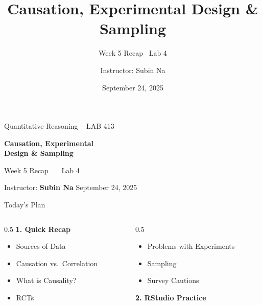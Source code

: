 \documentclass[aspectratio=169,11pt]{beamer}
\title{\bfseries Causation, Experimental Design \& Sampling}
\subtitle{Week 5 Recap \textbullet\ Lab 4}
\author{Instructor: Subin Na}
\institute{Quantitative Reasoning -- LAB 413}
\date{September 24, 2025}
\begin{document}
{
\begin{frame}
  \vfill
  {\color{qrgray}\small Quantitative Reasoning -- LAB 413}\\[0.6em]
  {\color{qrnavy}\huge\bfseries Causation, Experimental\\[0.15em]Design \& Sampling\par}
  \vspace{0.4em}
  {\color{qrblue}\large Week 5 Recap \ \textbullet\ \ Lab 4}\par
  \vspace{1.6em}
  {\color{qrgray} Instructor: \textbf{Subin Na} \hfill September 24, 2025}
  \vfill
\end{frame}
}

\begin{frame}{Today's Plan}
  \begin{columns}[T]
    \begin{column}{0.5\textwidth}
      \textbf{\color{qrnavy}1. Quick Recap}
      \begin{itemize}
        \item Sources of Data
        \item Causation vs.\ Correlation
        \item What is Causality?
        \item RCTs
      \end{itemize}
    \end{column}
    \begin{column}{0.5\textwidth}
      \begin{itemize}
        \item Problems with Experiments
        \item Sampling
        \item Survey Cautions
      \end{itemize}
      \vspace{0.8em}
      \textbf{\color{qrnavy}2. RStudio Practice}
    \end{column}
  \end{columns}
\end{frame}
\end{document}
